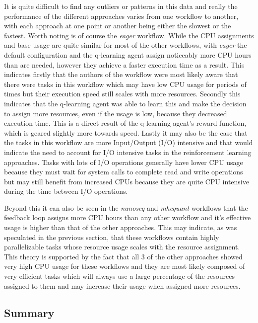 It is quite difficult to find any outliers or patterns in this data and really the performance of the different approaches varies from one workflow to another, with each approach at one point or another being either the slowest or the fastest. Worth noting is of course the \textit{eager} workflow. While the CPU assignments and base usage are quite similar for most of the other workflows, with \textit{eager} the default configuration and the q-learning agent assign noticeably more CPU hours than are needed, however they achieve a faster execution time as a result. This indicates firstly that the authors of the workflow were most likely aware that there were tasks in this workflow which may have low CPU usage for periods of times but their execution speed still scales with more resources. Secondly this indicates that the q-learning agent was able to learn this and make the decision to assign more resources, even if the usage is low, because they decreased execution time. This is a direct result of the q-learning agent’s reward function, which is geared slightly more towards speed. Lastly it may also be the case that the tasks in this workflow are more Input/Output (I/O) intensive and that would indicate the need to account for I/O intensive tasks in the reinforcement learning approaches. Tasks with lots of I/O operations generally have lower CPU usage because they must wait for system calls to complete read and write operations but may still benefit from increased CPUs because they are quite CPU intensive during the time between I/O operations.

Beyond this it can also be seen in the \textit{nanoseq} and \textit{mhcquant} workflows that the feedback loop assigns more CPU hours than any other workflow and it’s effective usage is higher than that of the other approaches. This may indicate, as was speculated in the previous section, that these workflows contain highly parallelizable tasks whose resource usage scales with the resource assignment. This theory is supported by the fact that all 3 of the other approaches showed very high CPU usage for these workflows and they are most likely composed of very efficient tasks which will always use a large percentage of the resources assigned to them and may increase their usage when assigned more resources.

\subsection{Summary}
\label{sub:summary}

